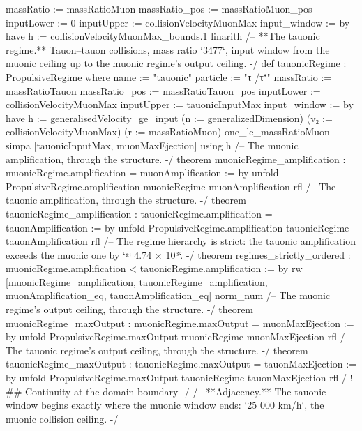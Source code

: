 \documentclass[11pt,a4paper]{article}
\begin{document}
{  massRatio := massRatioMuon
  massRatio\_\allowbreak{}pos := massRatioMuon\_\allowbreak{}pos
  inputLower := 0
  inputUpper := collisionVelocityMuonMax
  input\_\allowbreak{}window := by
    have h := collisionVelocityMuonMax\_\allowbreak{}bounds.1
    linarith
\mbox{}
/-- **The tauonic regime.**  Tauon–tauon collisions, mass ratio `3477`, input
window from the muonic ceiling up to the muonic regime's output ceiling. -/
def tauonicRegime : PropulsiveRegime where
  name := "tauonic"
  particle := "τ⁻/τ⁺"
  massRatio := massRatioTauon
  massRatio\_\allowbreak{}pos := massRatioTauon\_\allowbreak{}pos
  inputLower := collisionVelocityMuonMax
  inputUpper := tauonicInputMax
  input\_\allowbreak{}window := by
    have h := generalisedVelocity\_\allowbreak{}ge\_\allowbreak{}input
      (n := generalizedDimension) (v₂ := collisionVelocityMuonMax) (r := massRatioMuon)
      one\_\allowbreak{}le\_\allowbreak{}massRatioMuon
    simpa [tauonicInputMax, muonMaxEjection] using h
\mbox{}
/-- The muonic amplification, through the structure. -/
theorem muonicRegime\_\allowbreak{}amplification :
    muonicRegime.amplification = muonAmplification := by
  unfold PropulsiveRegime.amplification muonicRegime muonAmplification
  rfl
\mbox{}
/-- The tauonic amplification, through the structure. -/
theorem tauonicRegime\_\allowbreak{}amplification :
    tauonicRegime.amplification = tauonAmplification := by
  unfold PropulsiveRegime.amplification tauonicRegime tauonAmplification
  rfl
\mbox{}
/-- The regime hierarchy is strict: the tauonic amplification exceeds the
muonic one by `≈ 4.74 × 10³`. -/
theorem regimes\_\allowbreak{}strictly\_\allowbreak{}ordered :
    muonicRegime.amplification \textless{} tauonicRegime.amplification := by
  rw [muonicRegime\_\allowbreak{}amplification, tauonicRegime\_\allowbreak{}amplification,
    muonAmplification\_\allowbreak{}eq, tauonAmplification\_\allowbreak{}eq]
  norm\_\allowbreak{}num
\mbox{}
/-- The muonic regime's output ceiling, through the structure. -/
theorem muonicRegime\_\allowbreak{}maxOutput : muonicRegime.maxOutput = muonMaxEjection := by
  unfold PropulsiveRegime.maxOutput muonicRegime muonMaxEjection
  rfl
\mbox{}
/-- The tauonic regime's output ceiling, through the structure. -/
theorem tauonicRegime\_\allowbreak{}maxOutput : tauonicRegime.maxOutput = tauonMaxEjection := by
  unfold PropulsiveRegime.maxOutput tauonicRegime tauonMaxEjection
  rfl
\mbox{}
/-! \#\# Continuity at the domain boundary -/
\mbox{}
/-- **Adjacency.**  The tauonic window begins exactly where the muonic window
ends: `25 000 km/h`, the muonic collision ceiling. -/
}
\end{document}
